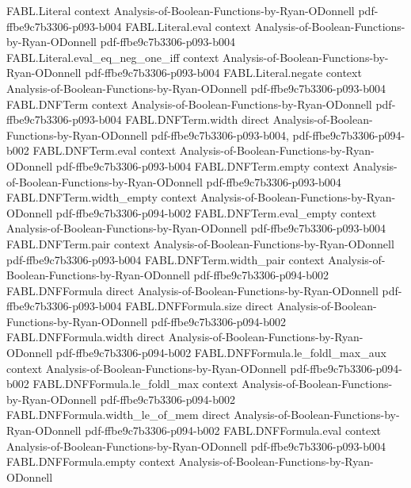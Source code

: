\begin{theorem}
\proofstep
  {FABL.Literal}
  {context}
  {Analysis-of-Boolean-Functions-by-Ryan-ODonnell}
  {pdf-ffbe9c7b3306-p093-b004}
\proofstep
  {FABL.Literal.eval}
  {context}
  {Analysis-of-Boolean-Functions-by-Ryan-ODonnell}
  {pdf-ffbe9c7b3306-p093-b004}
\proofstep
  {FABL.Literal.eval_eq_neg_one_iff}
  {context}
  {Analysis-of-Boolean-Functions-by-Ryan-ODonnell}
  {pdf-ffbe9c7b3306-p093-b004}
\proofstep
  {FABL.Literal.negate}
  {context}
  {Analysis-of-Boolean-Functions-by-Ryan-ODonnell}
  {pdf-ffbe9c7b3306-p093-b004}
\proofstep
  {FABL.DNFTerm}
  {context}
  {Analysis-of-Boolean-Functions-by-Ryan-ODonnell}
  {pdf-ffbe9c7b3306-p093-b004}
\proofstep
  {FABL.DNFTerm.width}
  {direct}
  {Analysis-of-Boolean-Functions-by-Ryan-ODonnell}
  {pdf-ffbe9c7b3306-p093-b004,
    pdf-ffbe9c7b3306-p094-b002}
\proofstep
  {FABL.DNFTerm.eval}
  {context}
  {Analysis-of-Boolean-Functions-by-Ryan-ODonnell}
  {pdf-ffbe9c7b3306-p093-b004}
\proofstep
  {FABL.DNFTerm.empty}
  {context}
  {Analysis-of-Boolean-Functions-by-Ryan-ODonnell}
  {pdf-ffbe9c7b3306-p093-b004}
\proofstep
  {FABL.DNFTerm.width_empty}
  {context}
  {Analysis-of-Boolean-Functions-by-Ryan-ODonnell}
  {pdf-ffbe9c7b3306-p094-b002}
\proofstep
  {FABL.DNFTerm.eval_empty}
  {context}
  {Analysis-of-Boolean-Functions-by-Ryan-ODonnell}
  {pdf-ffbe9c7b3306-p093-b004}
\proofstep
  {FABL.DNFTerm.pair}
  {context}
  {Analysis-of-Boolean-Functions-by-Ryan-ODonnell}
  {pdf-ffbe9c7b3306-p093-b004}
\proofstep
  {FABL.DNFTerm.width_pair}
  {context}
  {Analysis-of-Boolean-Functions-by-Ryan-ODonnell}
  {pdf-ffbe9c7b3306-p094-b002}
\proofstep
  {FABL.DNFFormula}
  {direct}
  {Analysis-of-Boolean-Functions-by-Ryan-ODonnell}
  {pdf-ffbe9c7b3306-p093-b004}
\proofstep
  {FABL.DNFFormula.size}
  {direct}
  {Analysis-of-Boolean-Functions-by-Ryan-ODonnell}
  {pdf-ffbe9c7b3306-p094-b002}
\proofstep
  {FABL.DNFFormula.width}
  {direct}
  {Analysis-of-Boolean-Functions-by-Ryan-ODonnell}
  {pdf-ffbe9c7b3306-p094-b002}
\proofstep
  {FABL.DNFFormula.le_foldl_max_aux}
  {context}
  {Analysis-of-Boolean-Functions-by-Ryan-ODonnell}
  {pdf-ffbe9c7b3306-p094-b002}
\proofstep
  {FABL.DNFFormula.le_foldl_max}
  {context}
  {Analysis-of-Boolean-Functions-by-Ryan-ODonnell}
  {pdf-ffbe9c7b3306-p094-b002}
\proofstep
  {FABL.DNFFormula.width_le_of_mem}
  {direct}
  {Analysis-of-Boolean-Functions-by-Ryan-ODonnell}
  {pdf-ffbe9c7b3306-p094-b002}
\proofstep
  {FABL.DNFFormula.eval}
  {context}
  {Analysis-of-Boolean-Functions-by-Ryan-ODonnell}
  {pdf-ffbe9c7b3306-p093-b004}
\proofstep
  {FABL.DNFFormula.empty}
  {context}
  {Analysis-of-Boolean-Functions-by-Ryan-ODonnell}

\end{theorem}
